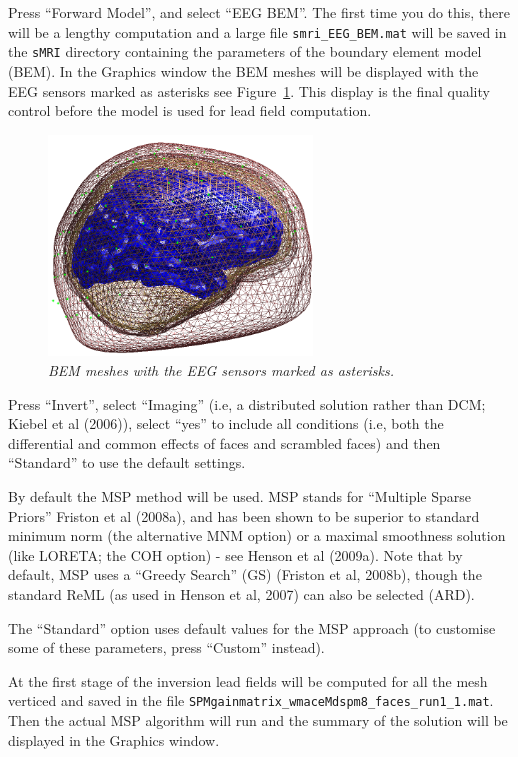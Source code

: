 Press ``Forward Model'', and select ``EEG BEM''. The first time you do this, there will be a lengthy computation and a large file \texttt{smri\_EEG\_BEM.mat} will be saved in the \texttt{sMRI} directory containing the parameters of the boundary element model (BEM). In the Graphics window the BEM meshes will be displayed with the EEG sensors marked as asterisks see Figure~\ref{multimodal:fig:2}. This display is the final quality control before the model is used for lead field computation.

\begin{figure}
\begin{center}
\includegraphics[width=70mm]{multimodal/figures/eeg_forward.png}
\caption{\em BEM meshes with the EEG sensors marked as asterisks.\label{multimodal:fig:2}}
\end{center}
\end{figure}

Press ``Invert'', select ``Imaging'' (i.e, a distributed solution rather than DCM; Kiebel et al (2006)), select ``yes'' to include all conditions (i.e, both the differential and common effects of faces and scrambled faces) and then ``Standard'' to use the default settings.

By default the MSP method will be used. MSP stands for ``Multiple Sparse Priors'' Friston et al (2008a), and has been shown to be superior to standard minimum norm (the alternative MNM option) or a maximal smoothness solution (like LORETA; the COH option) - see Henson et al (2009a). Note that by default, MSP uses a ``Greedy Search'' (GS) (Friston et al, 2008b), though the standard ReML (as used in Henson et al, 2007) can also be selected (ARD).

The ``Standard'' option uses default values for the MSP approach (to customise some of these parameters, press ``Custom'' instead).

At the first stage of the inversion lead fields will be computed for all the mesh verticed and saved in the file \texttt{SPMgainmatrix\_wmaceMdspm8\_faces\_run1\_1.mat}. Then the actual MSP algorithm will run and the summary of the solution will be displayed in the Graphics window.

